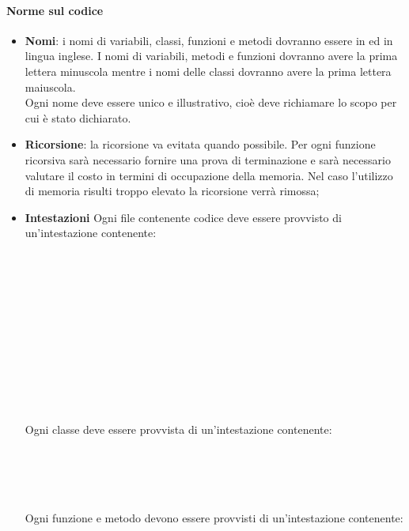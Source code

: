 \paragraph{Norme sul codice}
\begin{itemize}
	\item \textbf{Nomi}: i nomi di variabili, classi, funzioni e metodi dovranno essere in  ed in lingua inglese. I nomi di variabili, metodi e funzioni dovranno avere la prima lettera minuscola mentre i nomi delle classi dovranno avere la prima lettera maiuscola.\\ Ogni nome deve essere unico e illustrativo, cioè deve richiamare lo scopo per cui è stato dichiarato.
	\item \textbf{Ricorsione}: la ricorsione va evitata quando possibile. Per ogni funzione ricorsiva sarà necessario fornire una prova di terminazione e sarà necessario valutare il costo in termini di occupazione della memoria. Nel caso l’utilizzo di memoria risulti troppo elevato la ricorsione verrà rimossa;
	\item \textbf{Intestazioni} \Spazio
	Ogni file contenente codice deve essere provvisto di un'intestazione contenente:

	\code{/*} \\
	 \\
	 \\
	 \\
	 \\
	 \\
	 \\
	\\\\
	\\
	\code{*/} \\

Ogni classe deve essere provvista di un'intestazione contenente:

	\code{/*} \\
	 \\
	 \\
	\code{*/}\\

Ogni funzione e metodo devono essere provvisti di un'intestazione contenente:

	\code{/*} \\
	 \\
	 \\
	 \\
	\code{*/}\\


\end{itemize}
